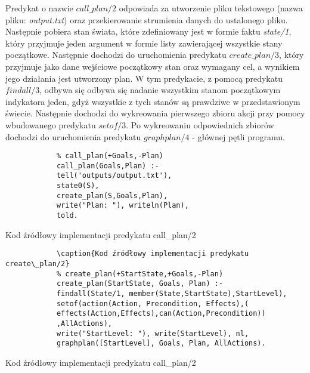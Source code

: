     Predykat o nazwie $call\_plan/2$ odpowiada za utworzenie pliku tekstowego (nazwa pliku: \textit{output.txt}) oraz przekierowanie strumienia danych 
    do ustalonego pliku. Następnie pobiera stan świata, które zdefiniowany jest w formie faktu \textit{state/1}, który przyjmuje jeden argument
    w formie listy zawierającej wszystkie stany początkowe. Następnie dochodzi do uruchomienia predykatu $create\_plan/3$, który przyjmuje jako dane
    wejściowe początkowy stan oraz wymagany cel, a wynikiem jego działania jest utworzony plan. W tym predykacie, z pomocą predykatu $findall/3$, odbywa się 
    odbywa się nadanie wszystkim stanom początkowym indykatora jeden, gdyż wszystkie z tych stanów są prawdziwe w przedstawionym świecie. 
    Następnie dochodzi do wykreowania pierwszego zbioru akcji przy pomocy wbudowanego predykatu $setof/3$. Po wykreowaniu odpowiednich zbiorów 
    dochodzi do uruchomienia predykatu $graphplan/4$ - głównej pętli programu.

    \begin{listing}[H]
        \begin{verbatim}
            % call_plan(+Goals,-Plan)
            call_plan(Goals,Plan) :-
            tell('outputs/output.txt'),
            state0(S),
            create_plan(S,Goals,Plan),
            write("Plan: "), writeln(Plan),
            told.
        \end{verbatim}
        \caption{Kod źródłowy implementacji predykatu call\_plan/2}
    \end{listing}

    \begin{listing}[H]
        \begin{verbatim}
            \caption{Kod źródłowy implementacji predykatu create\_plan/2}
            % create_plan(+StartState,+Goals,-Plan)
            create_plan(StartState, Goals, Plan) :-
            findall(State/1, member(State,StartState),StartLevel),
            setof(action(Action, Precondition, Effects),(
            effects(Action,Effects),can(Action,Precondition))
            ,AllActions),
            write("StartLevel: "), write(StartLevel), nl,
            graphplan([StartLevel], Goals, Plan, AllActions).
    \end{verbatim}
    \caption{Kod źródłowy implementacji predykatu call\_plan/2}
\end{listing}

